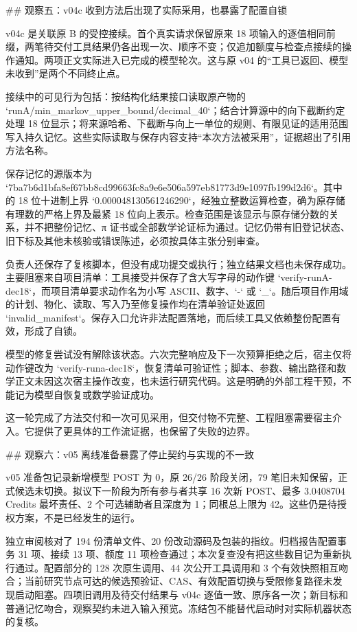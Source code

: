 ## 观察五：v04c 收到方法后出现了实际采用，也暴露了配置自锁

v04c 是关联原 B 的受控接续。首个真实请求保留原来 18 项输入的逐值相同前缀，两笔待交付工具结果仍各出现一次、顺序不变；仅追加额度与检查点接续的操作通知。两项正文实际进入已完成的模型轮次。这与原 v04 的“工具已返回、模型未收到”是两个不同终止点。

接续中的可见行为包括：按结构化结果接口读取原产物的 `runA/min_markov_upper_bound/decimal_40`；结合计算源中的向下截断约定处理 18 位显示；将来源哈希、下截断与向上一单位的规则、有限见证的适用范围写入持久记忆。这些实际读取与保存内容支持“本次方法被采用”，证据超出了引用方法名称。

保存记忆的源版本为 `7ba7b6d1bfa8ef67bb8cd99663fc8a9e6e506a597eb81773d9e1097fb199d2d6`。其中的 18 位十进制上界 `0.000048130561246290`，经独立整数运算检查，确为原存储有理数的严格上界及最紧 18 位向上表示。检查范围是该显示与原存储分数的关系，并不把整份记忆、π 证书或全部数学论证标为通过。记忆仍带有旧登记状态、旧下标及其他未核验或错误陈述，必须按具体主张分别审查。

负责人还保存了复核脚本，但没有成功提交或执行；独立结果文档也未保存成功。主要阻塞来自项目清单：工具接受并保存了含大写字母的动作键 `verify-runA-dec18`，而项目清单要求动作名为小写 ASCII、数字、`-` 或 `_`。随后项目作用域的计划、物化、读取、写入乃至修复操作均在清单验证处返回 `invalid_manifest`。保存入口允许非法配置落地，而后续工具又依赖整份配置有效，形成了自锁。

模型的修复尝试没有解除该状态。六次完整响应及下一次预算拒绝之后，宿主仅将动作键改为 `verify-runa-dec18`，恢复清单可验证性；脚本、参数、输出路径和数学正文未因这次宿主操作改变，也未运行研究代码。这是明确的外部工程干预，不能记为模型自恢复或数学验证成功。

这一轮完成了方法交付和一次可见采用，但交付物不完整、工程阻塞需要宿主介入。它提供了更具体的工作流证据，也保留了失败的边界。

## 观察六：v05 离线准备暴露了停止契约与实现的不一致

v05 准备包记录新增模型 POST 为 0，原 26/26 阶段关闭，79 笔旧未知保留，正式候选未切换。拟议下一阶段为所有参与者共享 16 次新 POST、最多 3.0408704 Credits 最坏责任、2 个可选辅助者且深度为 1；同根总上限为 42。这些仍是待授权方案，不是已经发生的运行。

独立审阅核对了 194 份清单文件、20 份改动源码及包装的指纹。归档报告配置事务 31 项、接续 13 项、额度 11 项检查通过；本次复查没有把这些数目记为重新执行通过。配置部分的 128 次原生调用、44 次公开工具调用和 3 个有效快照相互吻合；当前研究节点可达的候选预验证、CAS、有效配置切换与受限修复路径未发现启动阻塞。四项旧调用及待交付结果与 v04c 逐值一致、原序各一次；新目标和普通记忆吻合，观察契约未进入输入预览。冻结包不能替代启动时对实际机器状态的复核。

